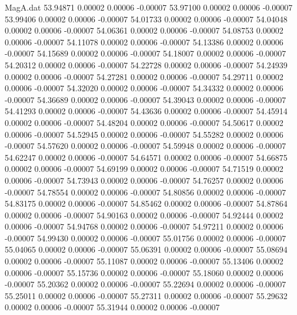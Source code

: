 \begin{filecontents}{MagA.dat}
  53.94871    0.00002    0.00006   -0.00007
  53.97100    0.00002    0.00006   -0.00007
  53.99406    0.00002    0.00006   -0.00007
  54.01733    0.00002    0.00006   -0.00007
  54.04048    0.00002    0.00006   -0.00007
  54.06361    0.00002    0.00006   -0.00007
  54.08753    0.00002    0.00006   -0.00007
  54.11078    0.00002    0.00006   -0.00007
  54.13386    0.00002    0.00006   -0.00007
  54.15689    0.00002    0.00006   -0.00007
  54.18007    0.00002    0.00006   -0.00007
  54.20312    0.00002    0.00006   -0.00007
  54.22728    0.00002    0.00006   -0.00007
  54.24939    0.00002    0.00006   -0.00007
  54.27281    0.00002    0.00006   -0.00007
  54.29711    0.00002    0.00006   -0.00007
  54.32020    0.00002    0.00006   -0.00007
  54.34332    0.00002    0.00006   -0.00007
  54.36689    0.00002    0.00006   -0.00007
  54.39043    0.00002    0.00006   -0.00007
  54.41293    0.00002    0.00006   -0.00007
  54.43636    0.00002    0.00006   -0.00007
  54.45914    0.00002    0.00006   -0.00007
  54.48204    0.00002    0.00006   -0.00007
  54.50617    0.00002    0.00006   -0.00007
  54.52945    0.00002    0.00006   -0.00007
  54.55282    0.00002    0.00006   -0.00007
  54.57620    0.00002    0.00006   -0.00007
  54.59948    0.00002    0.00006   -0.00007
  54.62247    0.00002    0.00006   -0.00007
  54.64571    0.00002    0.00006   -0.00007
  54.66875    0.00002    0.00006   -0.00007
  54.69199    0.00002    0.00006   -0.00007
  54.71519    0.00002    0.00006   -0.00007
  54.73943    0.00002    0.00006   -0.00007
  54.76257    0.00002    0.00006   -0.00007
  54.78554    0.00002    0.00006   -0.00007
  54.80856    0.00002    0.00006   -0.00007
  54.83175    0.00002    0.00006   -0.00007
  54.85462    0.00002    0.00006   -0.00007
  54.87864    0.00002    0.00006   -0.00007
  54.90163    0.00002    0.00006   -0.00007
  54.92444    0.00002    0.00006   -0.00007
  54.94768    0.00002    0.00006   -0.00007
  54.97211    0.00002    0.00006   -0.00007
  54.99430    0.00002    0.00006   -0.00007
  55.01756    0.00002    0.00006   -0.00007
  55.04065    0.00002    0.00006   -0.00007
  55.06391    0.00002    0.00006   -0.00007
  55.08694    0.00002    0.00006   -0.00007
  55.11087    0.00002    0.00006   -0.00007
  55.13406    0.00002    0.00006   -0.00007
  55.15736    0.00002    0.00006   -0.00007
  55.18060    0.00002    0.00006   -0.00007
  55.20362    0.00002    0.00006   -0.00007
  55.22694    0.00002    0.00006   -0.00007
  55.25011    0.00002    0.00006   -0.00007
  55.27311    0.00002    0.00006   -0.00007
  55.29632    0.00002    0.00006   -0.00007
  55.31944    0.00002    0.00006   -0.00007

\end{filecontents}
